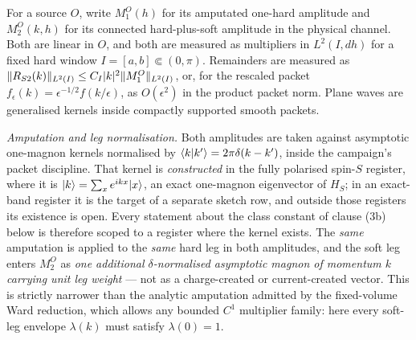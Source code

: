 \begin{definition}
\label{def:amputation-convention}
For a source $O$, write $M_1^O(h)$ for its amputated one-hard amplitude and
$M_2^O(k,h)$ for its connected hard-plus-soft amplitude in the physical
channel. Both are linear in $O$, and both are measured as multipliers in
$L^2(I,dh)$ for a fixed hard window $I=[a,b]\Subset(0,\pi)$. Remainders are
measured as
$\lVert R_{S2}(k)\rVert_{L^2(I)}\le C_I\lvert k\rvert^2\lVert M_1^O\rVert_{L^2(I)}$, or, for the
rescaled packet $f_\epsilon(k)=\epsilon^{-1/2}f(k/\epsilon)$, as $O(\epsilon^2)$
in the product packet norm. Plane waves are generalised kernels inside
compactly supported smooth packets.

\emph{Amputation and leg normalisation.} Both amplitudes are taken against
asymptotic one-magnon kernels normalised by $\langle k|k'\rangle=2\pi\delta(k-k')$,
inside the campaign's packet discipline. That kernel is \emph{constructed} in
the fully polarised spin-$S$ register, where it is
$|k\rangle=\sum_xe^{ikx}|x\rangle$, an exact one-magnon eigenvector of $H_S$; in
an exact-band register it is the target of a separate sketch row, and outside
those registers its existence is open. Every statement about the class
constant of clause (3b) below is therefore scoped to a register where the
kernel exists. The \emph{same} amputation is applied to the \emph{same} hard
leg in both amplitudes, and the soft leg enters $M_2^O$ as \emph{one
additional $\delta$-normalised asymptotic magnon of momentum $k$ carrying unit
leg weight} --- not as a charge-created or current-created vector. This is
strictly narrower than the analytic amputation admitted by the fixed-volume
Ward reduction, which allows any bounded $C^1$ multiplier family: here every
soft-leg envelope $\lambda(k)$ must satisfy $\lambda(0)=1$.
\end{definition}

